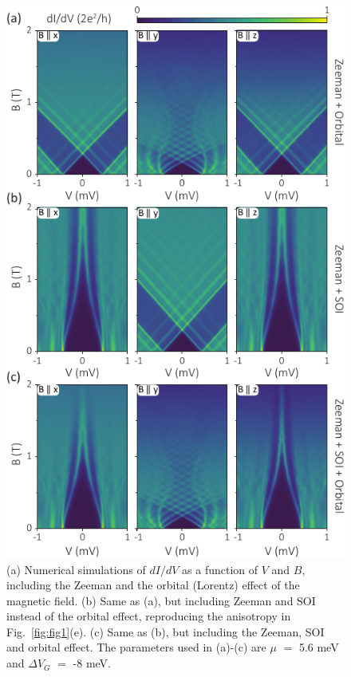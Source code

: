 \begin{figure}
\begin{center}
\includegraphics[width=0.7\columnwidth]{chapter_spinorbit/figures/Fig2.pdf}
\caption{\label{fig:fig2}
(a) Numerical simulations of $dI/dV$ as a function of $V$ and $B$, including the Zeeman and the orbital (Lorentz) effect of the magnetic field.
(b) Same as (a), but including Zeeman and SOI instead of the orbital effect, reproducing the anisotropy in Fig.~\ref{fig:fig1}(e).
(c) Same as (b), but including the Zeeman, SOI and orbital effect.
The parameters used in (a)-(c) are $\mu$ $=$ 5.6 meV and $\Delta V_G$ $=$ -8 meV.
}
\end{center}
\end{figure}

